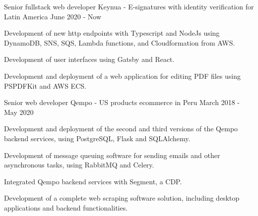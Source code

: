 

\begin{cventries}

  \cventry
    {Senior fullstack web developer} %
    {Keynua {\normalfont - E-signatures with identity verification for Latin America}} %
    {} %
    {June 2020 - Now} %
    {
      \begin{cvitems} %
        \item {Development of new http endpoints with Typescript and NodeJs using DynamoDB, SNS, SQS, Lambda functions, and Cloudformation from AWS.}
        \item {Development of user interfaces using Gatsby and React.}
        \item {Development and deployment of a web application for editing PDF files using PSPDFKit and AWS ECS.}
      \end{cvitems}
    }

  \cventry
    {Senior web developer} %
    {Qempo {\normalfont - US products ecommerce in Peru}} %
    {} %
    {March 2018 - May 2020} %
    {
      \begin{cvitems} %
        \item {Development and deployment of the second and third versions of the Qempo backend services, using PostgreSQL, Flask and SQLAlchemy.}
        \item {Development of message queuing software for sending emails and other asynchronous tasks, using RabbitMQ and Celery.}
        \item {Integrated Qempo backend services with Segment, a CDP.}
        \item {Development of a complete web scraping software solution, including desktop applications and backend functionalities.}
      \end{cvitems}
    }


\end{cventries}

